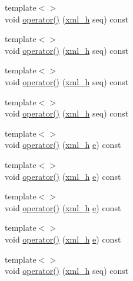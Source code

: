 \begin{DoxyCompactItemize}
{\footnotesize template$<$$>$ }\\void \hyperlink{struct_d_d4hep_1_1_converter_ac674592eedfa6bef641f368652b04a33}{operator()} (\hyperlink{_det_factory_helper_8h_ac13b3c79d2bc9214ff0cf5b8dc43dda6}{xml\+\_\+h} seq) const
\item 
{\footnotesize template$<$$>$ }\\void \hyperlink{struct_d_d4hep_1_1_converter_a353c37086d6bfad79d74dbb989c1a6ce}{operator()} (\hyperlink{_det_factory_helper_8h_ac13b3c79d2bc9214ff0cf5b8dc43dda6}{xml\+\_\+h} seq) const
\item 
{\footnotesize template$<$$>$ }\\void \hyperlink{struct_d_d4hep_1_1_converter_a8fa2472b82ed6e63f467af231c336319}{operator()} (\hyperlink{_det_factory_helper_8h_ac13b3c79d2bc9214ff0cf5b8dc43dda6}{xml\+\_\+h} seq) const
\item 
{\footnotesize template$<$$>$ }\\void \hyperlink{struct_d_d4hep_1_1_converter_abd59732927d299681cd2c6de56d6826b}{operator()} (\hyperlink{_det_factory_helper_8h_ac13b3c79d2bc9214ff0cf5b8dc43dda6}{xml\+\_\+h} seq) const
\item 
{\footnotesize template$<$$>$ }\\void \hyperlink{struct_d_d4hep_1_1_converter_aab1dcc85772c092ce84d517566ee7f25}{operator()} (\hyperlink{_det_factory_helper_8h_ac13b3c79d2bc9214ff0cf5b8dc43dda6}{xml\+\_\+h} \hyperlink{_volumes_8cpp_a8a9a1f93e9b09afccaec215310e64142}{e}) const
\item 
{\footnotesize template$<$$>$ }\\void \hyperlink{struct_d_d4hep_1_1_converter_a3d5d2b2b1b9ecc31ef5800c484a5715a}{operator()} (\hyperlink{_det_factory_helper_8h_ac13b3c79d2bc9214ff0cf5b8dc43dda6}{xml\+\_\+h} \hyperlink{_volumes_8cpp_a8a9a1f93e9b09afccaec215310e64142}{e}) const
\item 
{\footnotesize template$<$$>$ }\\void \hyperlink{struct_d_d4hep_1_1_converter_a3e5bad3d53f7bece1327c60b038e1cdb}{operator()} (\hyperlink{_det_factory_helper_8h_ac13b3c79d2bc9214ff0cf5b8dc43dda6}{xml\+\_\+h} \hyperlink{_volumes_8cpp_a8a9a1f93e9b09afccaec215310e64142}{e}) const
\item 
{\footnotesize template$<$$>$ }\\void \hyperlink{struct_d_d4hep_1_1_converter_a4b35a0d98dd264dae10197867aa1602b}{operator()} (\hyperlink{_det_factory_helper_8h_ac13b3c79d2bc9214ff0cf5b8dc43dda6}{xml\+\_\+h} \hyperlink{_volumes_8cpp_a8a9a1f93e9b09afccaec215310e64142}{e}) const
\item 
{\footnotesize template$<$$>$ }\\void \hyperlink{struct_d_d4hep_1_1_converter_a6d382f93a6ceaa0b4b6f67033a32a99d}{operator()} (\hyperlink{_det_factory_helper_8h_ac13b3c79d2bc9214ff0cf5b8dc43dda6}{xml\+\_\+h} seq) const
\end{DoxyCompactItemize}
